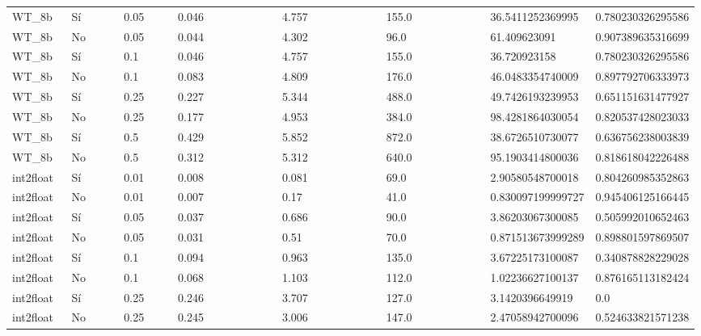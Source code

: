 {{\begin{longtable}{M{0.09\linewidth}M{0.09\linewidth}M{0.09\linewidth}M{0.09\linewidth}M{0.09\linewidth}M{0.09\linewidth}M{0.09\linewidth}M{0.09\linewidth}M{0.09\linewidth}M{0.09\linewidth}M{0.09\linewidth}}
WT\_8b & Sí & \num{0.05} & \num{0.046} &   & \num{4.757} &   & \num{155.0} &   & \num{36.5411252369995} & \num{0.780230326295586} \\
WT\_8b & No & \num{0.05} & \num{0.044} &   & \num{4.302} &   & \num{96.0} &   & \num{61.409623091} & \num{0.907389635316699} \\
WT\_8b & Sí & \num{0.1} & \num{0.046} &   & \num{4.757} &   & \num{155.0} &   & \num{36.720923158} & \num{0.780230326295586} \\
WT\_8b & No & \num{0.1} & \num{0.083} &   & \num{4.809} &   & \num{176.0} &   & \num{46.0483354740009} & \num{0.897792706333973} \\
WT\_8b & Sí & \num{0.25} & \num{0.227} &   & \num{5.344} &   & \num{488.0} &   & \num{49.7426193239953} & \num{0.651151631477927} \\
WT\_8b & No & \num{0.25} & \num{0.177} &   & \num{4.953} &   & \num{384.0} &   & \num{98.4281864030054} & \num{0.820537428023033} \\
WT\_8b & Sí & \num{0.5} & \num{0.429} &   & \num{5.852} &   & \num{872.0} &   & \num{38.6726510730077} & \num{0.636756238003839} \\
WT\_8b & No & \num{0.5} & \num{0.312} &   & \num{5.312} &   & \num{640.0} &   & \num{95.1903414800036} & \num{0.818618042226488} \\
int2float & Sí & \num{0.01} & \num{0.008} &   & \num{0.081} &   & \num{69.0} &   & \num{2.90580548700018} & \num{0.804260985352863} \\
int2float & No & \num{0.01} & \num{0.007} &   & \num{0.17} &   & \num{41.0} &   & \num{0.830097199999727} & \num{0.945406125166445} \\
int2float & Sí & \num{0.05} & \num{0.037} &   & \num{0.686} &   & \num{90.0} &   & \num{3.86203067300085} & \num{0.505992010652463} \\
int2float & No & \num{0.05} & \num{0.031} &   & \num{0.51} &   & \num{70.0} &   & \num{0.871513673999289} & \num{0.898801597869507} \\
int2float & Sí & \num{0.1} & \num{0.094} &   & \num{0.963} &   & \num{135.0} &   & \num{3.67225173100087} & \num{0.340878828229028} \\
int2float & No & \num{0.1} & \num{0.068} &   & \num{1.103} &   & \num{112.0} &   & \num{1.02236627100137} & \num{0.876165113182424} \\
int2float & Sí & \num{0.25} & \num{0.246} &   & \num{3.707} &   & \num{127.0} &   & \num{3.1420396649919} & \num{0.0} \\
int2float & No & \num{0.25} & \num{0.245} &   & \num{3.006} &   & \num{147.0} &   & \num{2.47058942700096} & \num{0.524633821571238} \\

\end{longtable}}}
